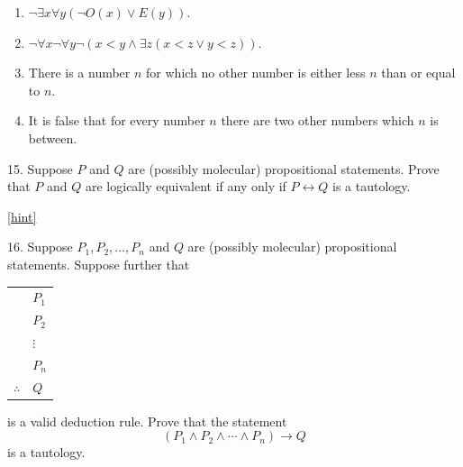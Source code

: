 \documentclass[10pt,]{book}
\theoremstyle{plain}
\theoremstyle{definition}
\theoremstyle{definition}
\theoremstyle{definition}
\numberwithin{equation}{chapter}
\newcommand{\hrulethin}  {\noalign{\hrule height 0.04em}}
\def\iff{\leftrightarrow}
\def\imp{\rightarrow}
\newcommand{\lt}{<}
\begin{document}
\begin{exerciselist}
\begin{enumerate}[label=(\alph*)]
\item\hypertarget{li-498}{}\(\neg \exists x \forall y (\neg O(x) \vee E(y))\).%
\item\hypertarget{li-499}{}\(\neg \forall x \neg \forall y \neg(x \lt  y \wedge \exists z (x \lt  z \vee y \lt  z))\).%
\item\hypertarget{li-500}{}\hypertarget{p-2389}{}%
There is a number \(n\) for which no other number is either less \(n\) than or equal to \(n\).%
\item\hypertarget{li-501}{}\hypertarget{p-2390}{}%
It is false that for every number \(n\) there are two other numbers which \(n\) is between.%
\end{enumerate}
%
\par\smallskip
\item[15.]\hypertarget{exercise-113}{}\hypertarget{p-2394}{}%
Suppose \(P\) and \(Q\) are (possibly molecular) propositional statements.  Prove that \(P\) and \(Q\) are logically equivalent if any only if \(P \iff Q\) is a tautology.%
\par\smallskip
\hfill{\tiny\hyperlink{a-B.4.15}{[hint]}\hypertarget{q-B.4.15}{}}\item[16.]\hypertarget{exercise-114}{}\hypertarget{p-2396}{}%
Suppose \(P_1, P_2, \ldots, P_n\) and \(Q\) are (possibly molecular) propositional statements.  Suppose further that%
\begin{sidebyside}{1}{0}{0}{0}
\begin{sbspanel}{1}
{\centering%
\begin{tabular}{ll}
&\(P_1\)\tabularnewline[0pt]
&\(P_2\)\tabularnewline[0pt]
&\(\vdots\)\tabularnewline[0pt]
&\(P_n\)\tabularnewline\hrulethin
\(\therefore\)&\(Q\)
\end{tabular}
\par}
\end{sbspanel}
\end{sidebyside}
\par
\hypertarget{p-2397}{}%
is a valid deduction rule.  Prove that the statement%
\begin{equation*}
(P_1 \wedge P_2 \wedge \cdots \wedge P_n) \imp Q
\end{equation*}
is a tautology.%
\par\smallskip
\end{exerciselist}
\typeout{************************************************}
\typeout{************************************************}
\end{document}
